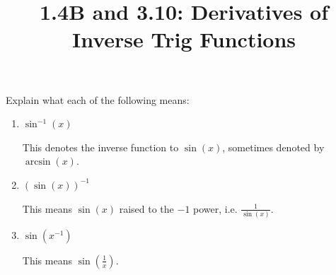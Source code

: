 \documentclass[nooutcomes]{ximera}
\title{1.4B and 3.10: Derivatives of Inverse Trig Functions}
\begin{document}
\begin{abstract}		\end{abstract}
\maketitle

\begin{problem}
Explain what each of the following means:
	\begin{enumerate}
	
	\item  $\sin^{-1}(x)$
		\begin{freeResponse}
		This denotes the inverse function to $\sin(x)$, sometimes denoted by $\arcsin(x)$.  
		\end{freeResponse}	
		
	\item  $\left( \sin(x) \right)^{-1}$
		\begin{freeResponse}
		This means $\sin(x)$ raised to the $-1$ power, i.e. $\frac{1}{\sin(x)}$.  
		\end{freeResponse}	
		
	\item  $\sin \left(x^{-1} \right)$
		\begin{freeResponse}
		This means $\sin \left( \frac{1}{x} \right)$.
		\end{freeResponse}	
		
	\end{enumerate}
\end{problem}
\end{document}
